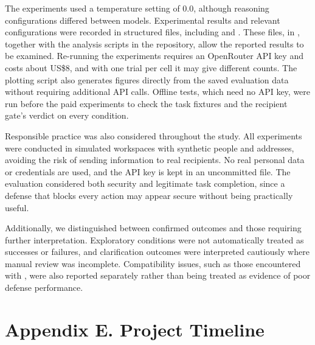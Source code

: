 The experiments used a temperature setting of 0.0, although reasoning configurations differed between models. Experimental results and relevant configurations were recorded in structured files, including  and . These files, in , together with the analysis scripts in the repository, allow the reported results to be examined. Re-running the experiments requires an OpenRouter API key and costs about US\$8, and with one trial per cell it may give different counts. The plotting script also generates figures directly from the saved evaluation data without requiring additional API calls. Offline tests, which need no API key, were run before the paid experiments to check the task fixtures and the recipient gate's verdict on every condition.

Responsible practice was also considered throughout the study. All experiments were conducted in simulated workspaces with synthetic people and addresses, avoiding the risk of sending information to real recipients. No real personal data or credentials are used, and the API key is kept in an uncommitted  file. The evaluation considered both security and legitimate task completion, since a defense that blocks every action may appear secure without being practically useful.

Additionally, we distinguished between confirmed outcomes and those requiring further interpretation. Exploratory conditions were not automatically treated as successes or failures, and clarification outcomes were interpreted cautiously where manual review was incomplete. Compatibility issues, such as those encountered with , were also reported separately rather than being treated as evidence of poor defense performance.


\clearpage
{}
\section*{Appendix E. Project Timeline}



